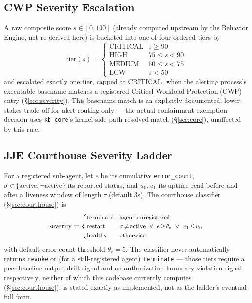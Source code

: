 \documentclass{article}
\begin{document}
\subsection{CWP Severity Escalation}
\label{sec:math-severity}

A raw composite score $s \in [0,100]$ (already computed upstream by the
Behavior Engine, not re-derived here) is bucketed into one of four
ordered tiers by
\begin{equation}
  \mathrm{tier}(s) = \begin{cases}
    \text{CRITICAL} & s \geq 90 \\
    \text{HIGH} & 75 \leq s < 90 \\
    \text{MEDIUM} & 50 \leq s < 75 \\
    \text{LOW} & s < 50
  \end{cases}
  \label{eq:severity}
\end{equation}
and escalated exactly one tier, capped at CRITICAL, when the alerting
process's executable basename matches a registered Critical Workload
Protection (CWP) entry (\S\ref{sec:severity}). This basename match is
an explicitly documented, lower-stakes trade-off for alert routing
only --- the actual containment-exemption decision uses \texttt{kb-core}'s
kernel-side path-resolved match (\S\ref{sec:core}), unaffected by this
rule.

\subsection{JJE Courthouse Severity Ladder}
\label{sec:math-courthouse}

For a registered sub-agent, let $e$ be its cumulative
\texttt{error\_count}, $\sigma \in \{\text{active}, \neg\text{active}\}$
its reported status, and $u_0, u_1$ its uptime read before and after a
liveness window of length $\tau$ (default $3$s). The courthouse
classifier (\S\ref{sec:courthouse}) is
\begin{equation}
  \small
  \mathrm{severity} = \begin{cases}
    \text{terminate} & \text{agent unregistered} \\
    \text{restart} & \sigma \!\neq\! \text{active} \ \lor\ e \!\geq\! \theta_e \ \lor\ u_1 \!\leq\! u_0 \\
    \text{healthy} & \text{otherwise}
  \end{cases}
  \normalsize
  \label{eq:courthouse}
\end{equation}
with default error-count threshold $\theta_e = 5$. The classifier never
automatically returns \texttt{revoke} or (for a still-registered agent)
\texttt{terminate} --- those tiers require a peer-baseline
output-drift signal and an authorization-boundary-violation signal
respectively, neither of which this codebase currently computes
(\S\ref{sec:courthouse});  is stated exactly as
implemented, not as the ladder's eventual full form.
\end{document}
